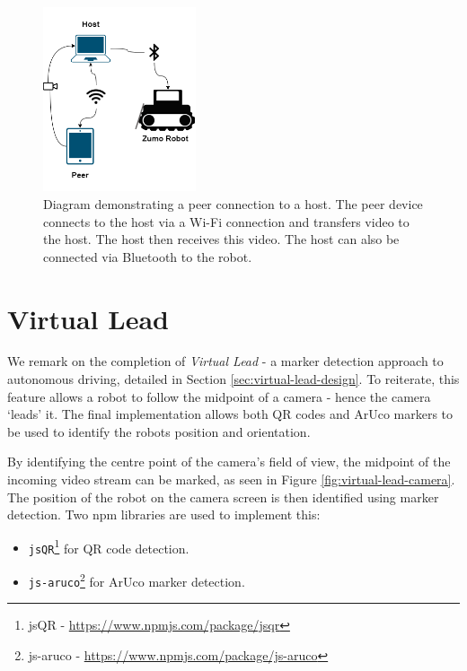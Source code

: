 \documentclass{l4proj}
\begin{document}
\begin{figure}[!ht]
    \centering
    \includegraphics[width=0.4\textwidth]{images/peer-connection.png}
    \caption{Diagram demonstrating a peer connection to a host. The peer device connects to the host via a Wi-Fi connection and transfers video to the host. The host then receives this video. The host can also be connected via Bluetooth to the robot.}
    \label{fig:peer-connection}
\end{figure}


\section{Virtual Lead}
We remark on the completion of \textit{Virtual Lead} - a marker detection approach to autonomous driving, detailed in Section \ref{sec:virtual-lead-design}. To reiterate, this feature allows a robot to follow the midpoint of a camera - hence the camera ‘leads’ it. The final implementation allows both QR codes and ArUco markers to be used to identify the robots position and orientation.

By identifying the centre point of the camera's field of view, the midpoint of the incoming video stream can be marked, as seen in Figure \ref{fig:virtual-lead-camera}. The position of the robot on the camera screen is then identified using marker detection. Two npm libraries are used to implement this:
\begin{itemize}
    \item \lstinline{jsQR}\footnote{jsQR - \url{https://www.npmjs.com/package/jsqr}} for QR code detection.
    \item \lstinline{js-aruco}\footnote{js-aruco - \url{https://www.npmjs.com/package/js-aruco}} for ArUco marker detection.
\end{itemize}
\end{document}
